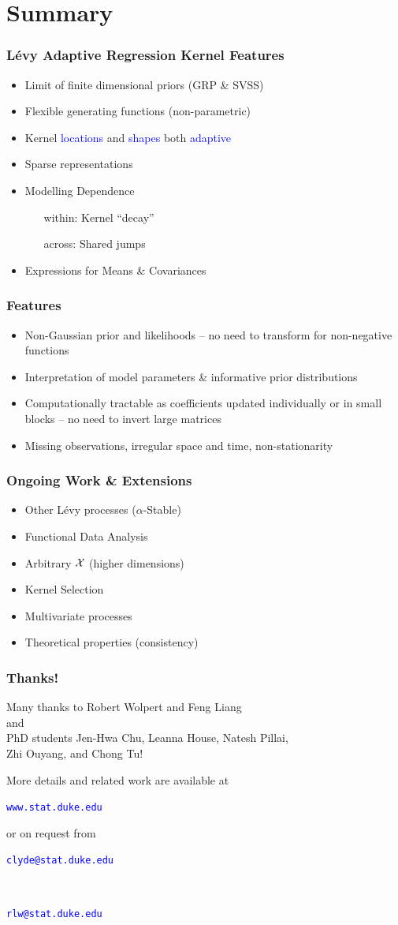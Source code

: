 \documentclass[dvips]{beamer}
\newcommand{\bs}[2]{\begin{frame} \frametitle{#1} 
{#2}
\end{frame} }
\newcommand{\blue}{\textcolor{Blue}}
\begin{document}
\section{Summary}
\bs{L\'evy Adaptive Regression  Kernel
  Features} {
  \begin{itemize}
  \item Limit of finite dimensional priors (GRP \& SVSS)
  \item Flexible generating functions (non-parametric)
  \item Kernel \blue{locations} and \blue{shapes} both \blue{adaptive}
  \item Sparse representations
  \item Modelling Dependence 
    \begin{itemize}
    \item[within:] Kernel ``decay''
    \item[across:] Shared jumps
    \end{itemize}
    \item Expressions for Means \& Covariances
    
  \end{itemize}
}
\bs{Features} {
  \begin{itemize}
  \item Non-Gaussian prior and likelihoods -- no need to transform for
  non-negative functions
  \item Interpretation of model parameters \& informative prior
  distributions

  \item Computationally tractable as coefficients updated individually
    or in small blocks -- no need to invert large matrices
  \item Missing observations, irregular space and time,  non-stationarity
  \end{itemize}
}



\bs{Ongoing Work \& Extensions} {
  \begin{itemize}
  \item Other L\'evy processes ($\alpha$-Stable)
  \item Functional Data Analysis
  \item Arbitrary $\mathcal{X}$ (higher dimensions)  
  \item Kernel Selection
  \item Multivariate processes  
  \item Theoretical properties (consistency)
  \end{itemize}
}
\bs{Thanks!} {
\begin{center}
Many thanks to Robert Wolpert and Feng Liang \\
and \\
PhD students Jen-Hwa
Chu, Leanna House, Natesh Pillai, \\ Zhi Ouyang, and Chong Tu!
\end{center}
\vspace{.5in}
More details and related work are available at
\centerline{\blue{ \texttt{www.stat.duke.edu}}}
or on request from 
\centerline{\blue{\texttt{clyde@stat.duke.edu}}} \\
\centerline{\blue{\texttt{rlw@stat.duke.edu}}} 
}

\end{document}
